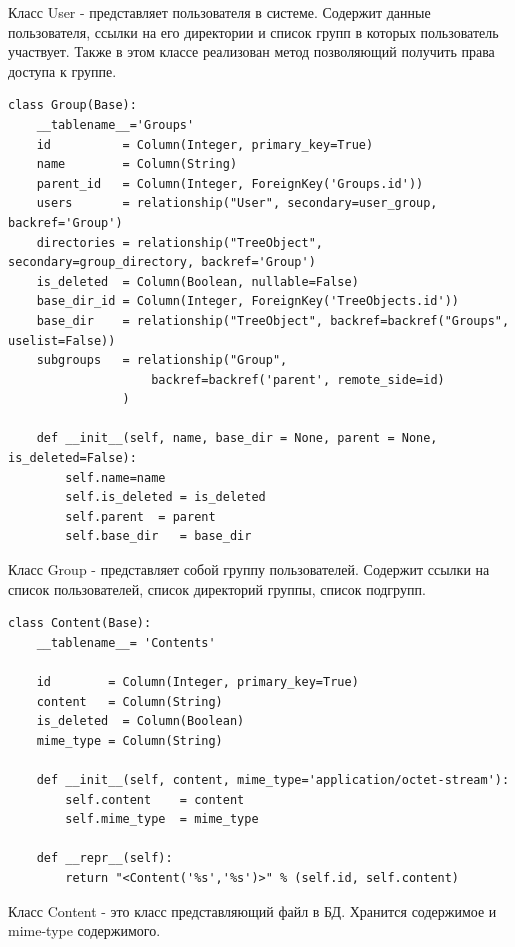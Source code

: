 \documentclass[utf8,usehyperref,12pt]{G7-32}
\begin{document}
Класс User - представляет пользователя в системе. Содержит данные пользователя, ссылки на его директории и список групп в которых пользователь участвует. Также в этом классе реализован метод позволяющий получить права доступа к группе.

\begin{verbatim}
class Group(Base):
    __tablename__='Groups'
    id          = Column(Integer, primary_key=True)    
    name        = Column(String)
    parent_id   = Column(Integer, ForeignKey('Groups.id'))
    users       = relationship("User", secondary=user_group, backref='Group')
    directories = relationship("TreeObject", secondary=group_directory, backref='Group')
    is_deleted  = Column(Boolean, nullable=False)
    base_dir_id = Column(Integer, ForeignKey('TreeObjects.id'))
    base_dir    = relationship("TreeObject", backref=backref("Groups", uselist=False))
    subgroups   = relationship("Group",
                    backref=backref('parent', remote_side=id)
                )
    
    def __init__(self, name, base_dir = None, parent = None, is_deleted=False):
        self.name=name
        self.is_deleted = is_deleted
        self.parent  = parent        
        self.base_dir   = base_dir

\end{verbatim}

Класс Group - представляет собой группу пользователей. Содержит ссылки на список пользователей, список директорий группы, список подгрупп.

\begin{verbatim}
class Content(Base):
    __tablename__= 'Contents'

    id        = Column(Integer, primary_key=True)
    content   = Column(String)    
    is_deleted  = Column(Boolean)
    mime_type = Column(String)
    
    def __init__(self, content, mime_type='application/octet-stream'):
        self.content    = content
        self.mime_type  = mime_type

    def __repr__(self):
        return "<Content('%s','%s')>" % (self.id, self.content)

\end{verbatim}

Класс Content - это класс представляющий файл в БД. Хранится содержимое и mime-type содержимого.
\end{document}
